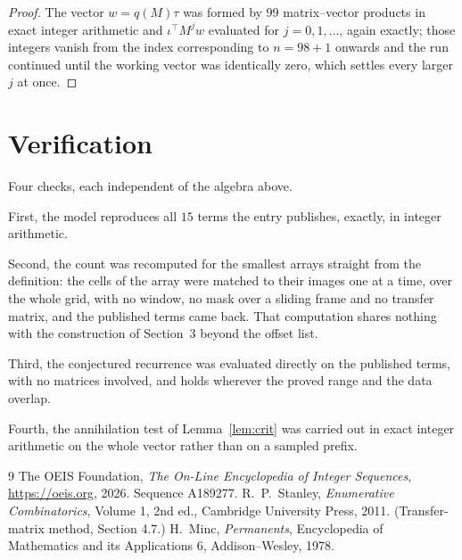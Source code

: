 \documentclass[11pt,a4paper]{article}
\theoremstyle{plain}
\theoremstyle{definition}
\begin{document}
\begin{proof}
The vector $w=q(M)\tau$ was formed by $99$ matrix--vector products in exact integer
arithmetic and $\iota^{\!\top}M^{j}w$ evaluated for $j=0,1,\dots$, again exactly; those
integers vanish from the index corresponding to $n=98+1$ onwards and the run continued
until the working vector was identically zero, which settles every larger $j$ at once.
\end{proof}

\section{Verification}

Four checks, each independent of the algebra above.

First, the model reproduces all $15$ terms the entry publishes, exactly, in integer
arithmetic.

Second, the count was recomputed for the smallest arrays straight from the definition: the
cells of the array were matched to their images one at a time, over the whole grid, with no
window, no mask over a sliding frame and no transfer matrix, and the published terms came back.
That computation shares nothing with the construction of Section~3 beyond the offset list.

Third, the conjectured recurrence was evaluated directly on the published terms, with no
matrices involved, and holds wherever the proved range and the data overlap.

Fourth, the annihilation test of Lemma~\ref{lem:crit} was carried out in exact integer
arithmetic on the whole vector rather than on a sampled prefix.

\begin{thebibliography}{9}
 The OEIS Foundation, \emph{The On-Line Encyclopedia of Integer
Sequences}, \url{https://oeis.org}, 2026. Sequence A189277.
 R.~P.~Stanley, \emph{Enumerative Combinatorics}, Volume 1, 2nd ed.,
Cambridge University Press, 2011. (Transfer-matrix method, Section 4.7.)
 H.~Minc, \emph{Permanents}, Encyclopedia of Mathematics and its
Applications 6, Addison--Wesley, 1978.
\end{thebibliography}
\end{document}
